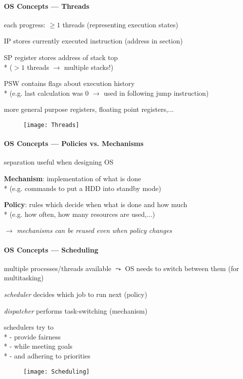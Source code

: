 \paragraph{OS Concepts --- Threads}
\begin{items}
	\item each progress: \( \geq 1 \) threads (representing execution states)
	\item IP stores currently executed instruction (address in  section)
	\item SP register stores address of stack top \\* (\( > 1 \) threads \( \to \) multiple stacks!)
	\item PSW contains flags about execution history \\* (e.g. last calculation was 0 \( \to \) used in following jump instruction)
	\item more general purpose registers, floating point registers,...
\end{items}
\begin{figure}[H]\centering\label{Threads}\texttt{[image: Threads]}\end{figure}

\paragraph{OS Concepts --- Policies vs. Mechanisms}
\begin{items}
	\item separation useful when designing OS
	\item \textbf{Mechanism}: implementation of what is done \\* (e.g. commands to put a HDD into standby mode)
	\item \textbf{Policy}: rules which decide when what is done and how much \\* (e.g. how often, how many resources are used,...)
	\item \( \to \) \emph{mechanisms can be reused even when policy changes}
\end{items}

\paragraph{OS Concepts --- Scheduling}
\begin{items}
	\item multiple processes/threads available \( \leadsto \) OS needs to switch between them (for multitasking)
	\item \emph{scheduler} decides which job to run next (policy)
	\item \emph{dispatcher} performs task-switching (mechanism)
	\item schedulers try to \\*
		- provide fairness \\*
		- while meeting goals \\*
		- and adhering to priorities
\end{items}
\begin{figure}[H]\centering\label{Scheduling}\texttt{[image: Scheduling]}\end{figure}

